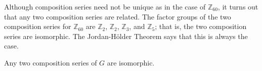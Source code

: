  
 
 
Although composition series need not be unique as in the case of
${\mathbb Z}_{60}$, it turns out that any two composition series are
related. The factor groups of the two composition series for ${\mathbb 
Z}_{60}$ are ${\mathbb Z}_2$,  ${\mathbb Z}_2$,  ${\mathbb Z}_3$, and  ${\mathbb
Z}_5$; that is,  the two composition series are isomorphic. The
Jordan-H\"{o}lder Theorem says that this is always the case.
 
 
\begin{theorem}
Any two composition series of $G$ are isomorphic.
\end{theorem}
 
